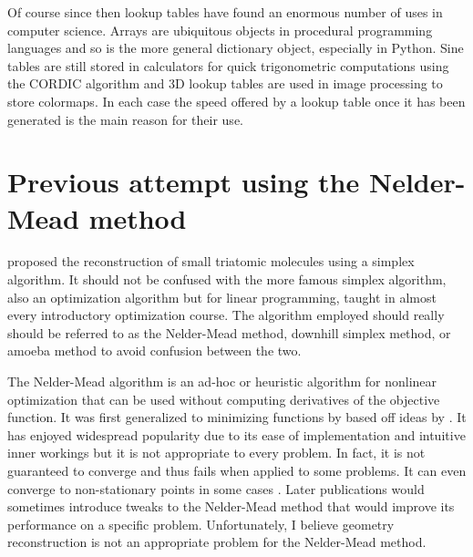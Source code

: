 Of course since then lookup tables have found an enormous number of uses in computer science. Arrays are ubiquitous objects in procedural programming languages and so is the more general dictionary object, especially in Python. Sine tables are still stored in calculators for quick trigonometric computations using the CORDIC algorithm and 3D lookup tables are used in image processing to store colormaps. In each case the speed offered by a lookup table once it has been generated is the main reason for their use.

\section{Previous attempt using the Nelder-Mead method}
\citet{Brichta09} proposed the reconstruction of small triatomic molecules using a simplex algorithm. It should not be confused with the more famous simplex algorithm, also an optimization algorithm but for linear programming, taught in almost every introductory optimization course. The algorithm employed should really should be referred to as the Nelder-Mead method, downhill simplex method, or amoeba method to avoid confusion between the two.\footnotemark


The Nelder-Mead algorithm is an ad-hoc or heuristic algorithm for nonlinear optimization that can be used without computing derivatives of the objective function\footnotemark. It was first generalized to minimizing functions by \citet{Nelder65} based off ideas by \citet{Spendley62}. It has enjoyed widespread popularity due to its ease of implementation and intuitive inner workings but it is not appropriate to every problem. In fact, it is not guaranteed to converge and thus fails when applied to some problems. It can even converge to non-stationary points in some cases \citep{McKinnon98}. Later publications would sometimes introduce tweaks to the Nelder-Mead method that would improve its performance on a specific problem. Unfortunately, I believe geometry reconstruction is not an appropriate problem for the Nelder-Mead method.



